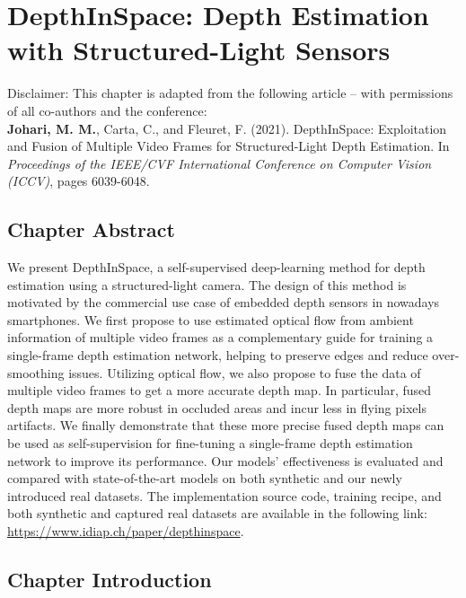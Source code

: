 \chapter{DepthInSpace: Depth Estimation with Structured-Light Sensors}

\begin{tcolorbox}[colback=gray!20, boxrule=1pt, colframe=black]
  Disclaimer: This chapter is adapted from the following article – with permissions of all co-authors and the conference: \\

    \textbf{Johari, M. M.}, Carta, C., and Fleuret, F. (2021). DepthInSpace: Exploitation and Fusion of Multiple Video Frames for Structured-Light Depth Estimation. In \textit{Proceedings of the IEEE/CVF International Conference on Computer Vision (ICCV)}, pages 6039-6048.
\end{tcolorbox}

\section{Chapter Abstract} \label{sec:chapter2}

We present DepthInSpace, a self-supervised deep-learning method for depth estimation using a structured-light camera. The design of this method is motivated by the commercial use case of embedded depth sensors in nowadays smartphones. We first propose to use estimated optical flow from ambient information of multiple video frames as a complementary guide for training a single-frame depth estimation network, helping to preserve edges and reduce over-smoothing issues. Utilizing optical flow, we also propose to fuse the data of multiple video frames to get a more accurate depth map. In particular, fused depth maps are more robust in occluded areas and incur less in flying pixels artifacts. We finally demonstrate that these more precise fused depth maps can be used as self-supervision for fine-tuning a single-frame depth estimation network to improve its performance. Our models' effectiveness is evaluated and compared with state-of-the-art models on both synthetic and our newly introduced real datasets. The implementation source code, training recipe, and both synthetic and captured real datasets are available in the following link: \href{https://www.idiap.ch/paper/depthinspace}{https://www.idiap.ch/paper/depthinspace}.

\section{Chapter Introduction}

